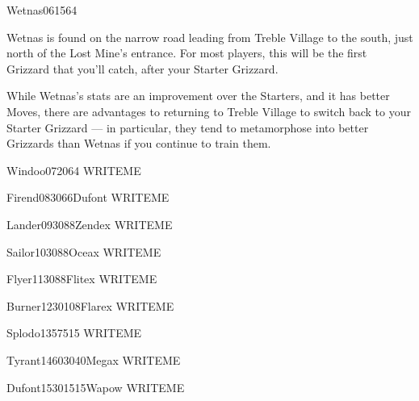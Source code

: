 \documentclass[10pt,twocolumn]{memoir}
\begin{document}
\begin{grizzardpage}{Wetnas}{06}{15}{6}{4}{}

Wetnas is  found on the narrow  road leading from Treble  Village to the
south, just  north of the Lost  Mine's entrance. For most  players, this
will   be   the  first   Grizzard   that   you'll  catch,   after   your
Starter Grizzard.

While Wetnas's  stats are an improvement  over the Starters, and  it has
better Moves,  there are  advantages to returning  to Treble  Village to
switch  back to  your Starter  Grizzard —  in particular,  they tend  to
metamorphose  into  better Grizzards  than  Wetnas  if you  continue  to
train them.
  
\end{grizzardpage}

\begin{grizzardpage}{Windoo}{07}{20}{6}{4}{}
  WRITEME
\end{grizzardpage}

\begin{grizzardpage}{Firend}{08}{30}66{Dufont}
  WRITEME
\end{grizzardpage}

\begin{grizzardpage}{Lander}{09}{30}88{Zendex}
  WRITEME
\end{grizzardpage}

\begin{grizzardpage}{Sailor}{10}{30}88{Oceax}
  WRITEME
\end{grizzardpage}

\begin{grizzardpage}{Flyer}{11}{30}88{Flitex}
  WRITEME
\end{grizzardpage}

\begin{grizzardpage}{Burner}{12}{30}{10}{8}{Flarex}
  WRITEME
\end{grizzardpage}

\begin{grizzardpage}{Splodo}{13}{5}{75}{15}{}
  WRITEME
\end{grizzardpage}

\begin{grizzardpage}{Tyrant}{14}{60}{30}{40}{Megax}
  WRITEME
\end{grizzardpage}

\begin{grizzardpage}{Dufont}{15}{30}{15}{15}{Wapow}
  WRITEME
\end{grizzardpage}
\end{document}
